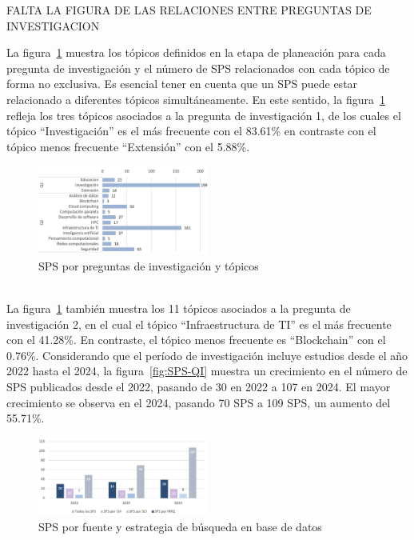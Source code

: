 FALTA LA FIGURA DE LAS RELACIONES ENTRE PREGUNTAS DE INVESTIGACION 

La figura~\ref{fig:SPS-topics} muestra los tópicos definidos en la etapa de planeación para cada pregunta de investigación y el número de SPS relacionados con cada tópico de forma no exclusiva. Es esencial tener en cuenta que un SPS puede estar relacionado a diferentes tópicos simultáneamente. En este sentido, la figura~\ref{fig:SPS-topics} refleja los tres tópicos asociados a la pregunta de investigación 1, de los cuales el tópico ``Investigación'' es el más frecuente con el 83.61\% en contraste con el tópico menos frecuente ``Extensión'' con el 5.88\%.
\begin{figure}[htbp]
    \centering
    \includegraphics[width=0.5\textwidth]{resources/images/resultados/SPS-topics.png}
    \caption{SPS por preguntas de investigación y tópicos}\label{fig:SPS-topics}
\end{figure}
\mbox{}\\
La figura~\ref{fig:SPS-topics} también muestra los 11 tópicos asociados a la pregunta de investigación 2, en el cual el tópico ``Infraestructura de TI'' es el más frecuente con el  41.28\%. En contraste, el tópico menos frecuente es ``Blockchain'' con el 0.76\%. Considerando que el período de investigación incluye estudios desde el año 2022 hasta el 2024, la figura~\ref{fig:SPS-QI} muestra un crecimiento en el número de SPS publicados desde el 2022, pasando de 30 en 2022 a 107 en 2024. El mayor crecimiento se observa en el 2024, pasando 70 SPS a 109 SPS, un aumento del 55.71\%.\\
\begin{figure}[htbp]
    \centering
    \includegraphics[width=0.5\textwidth]{resources/images/resultados/SPS-by-se.png}
    \caption{SPS por fuente y estrategia de búsqueda en base de datos}\label{fig:SPS-BY-SE}
\end{figure}
